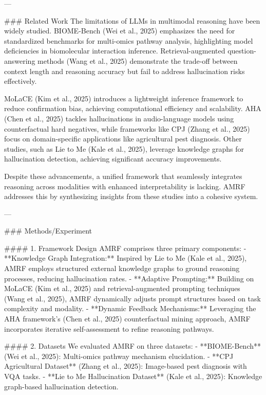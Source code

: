 ---

### Related Work  
The limitations of LLMs in multimodal reasoning have been widely studied. BIOME-Bench (Wei et al., 2025) emphasizes the need for standardized benchmarks for multi-omics pathway analysis, highlighting model deficiencies in biomolecular interaction inference. Retrieval-augmented question-answering methods (Wang et al., 2025) demonstrate the trade-off between context length and reasoning accuracy but fail to address hallucination risks effectively.  

MoLaCE (Kim et al., 2025) introduces a lightweight inference framework to reduce confirmation bias, achieving computational efficiency and scalability. AHA (Chen et al., 2025) tackles hallucinations in audio-language models using counterfactual hard negatives, while frameworks like CPJ (Zhang et al., 2025) focus on domain-specific applications like agricultural pest diagnosis. Other studies, such as Lie to Me (Kale et al., 2025), leverage knowledge graphs for hallucination detection, achieving significant accuracy improvements.  

Despite these advancements, a unified framework that seamlessly integrates reasoning across modalities with enhanced interpretability is lacking. AMRF addresses this by synthesizing insights from these studies into a cohesive system.

---

### Methods/Experiment  

#### 1. Framework Design  
AMRF comprises three primary components:  
- **Knowledge Graph Integration:** Inspired by Lie to Me (Kale et al., 2025), AMRF employs structured external knowledge graphs to ground reasoning processes, reducing hallucination rates.  
- **Adaptive Prompting:** Building on MoLaCE (Kim et al., 2025) and retrieval-augmented prompting techniques (Wang et al., 2025), AMRF dynamically adjusts prompt structures based on task complexity and modality.  
- **Dynamic Feedback Mechanisms:** Leveraging the AHA framework's (Chen et al., 2025) counterfactual mining approach, AMRF incorporates iterative self-assessment to refine reasoning pathways.

#### 2. Datasets  
We evaluated AMRF on three datasets:  
- **BIOME-Bench** (Wei et al., 2025): Multi-omics pathway mechanism elucidation.  
- **CPJ Agricultural Dataset** (Zhang et al., 2025): Image-based pest diagnosis with VQA tasks.  
- **Lie to Me Hallucination Dataset** (Kale et al., 2025): Knowledge graph-based hallucination detection.  

